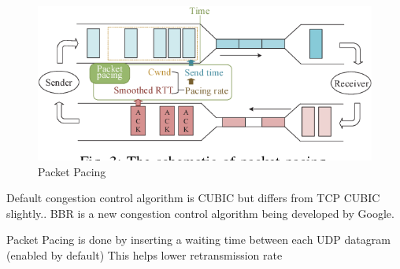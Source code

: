 \begin{frame}
    
        \begin{figure}[!ht]
        
        \includegraphics[width=1\textwidth]
        {figures/pacing.png}
        \endminipage\hfill
        \caption{\label{fig:pacing}Packet Pacing \cite{DBLP:conf/ipccc/YuXY17}}
    \end{figure}

Default congestion control algorithm is CUBIC\cite{DBLP:journals/internet/CuiLLWK17} but differs from TCP CUBIC slightly.\cite{quicgd}\cite{ietf-quic-recovery-18}. BBR is a new congestion control algorithm being developed by Google.\cite{DBLP:conf/pam/LiCJC18}

Packet Pacing is done by inserting a waiting time between each UDP datagram (enabled by default)
This helps lower retransmission rate \cite{DBLP:conf/infocom/AggarwalSA00}

\end{frame}
\clearpage

